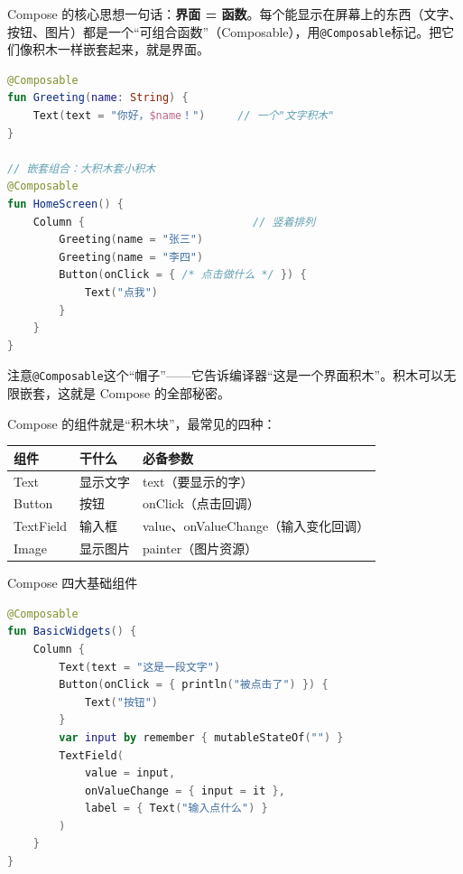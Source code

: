 


Compose 的核心思想一句话：\textbf{界面 = 函数}。每个能显示在屏幕上的东西（文字、按钮、图片）都是一个“可组合函数”（Composable），用\texttt{@Composable}标记。把它们像积木一样嵌套起来，就是界面。

\begin{lstlisting}[language=Kotlin]
@Composable
fun Greeting(name: String) {
    Text(text = "你好，$name！")     // 一个"文字积木"
}

// 嵌套组合：大积木套小积木
@Composable
fun HomeScreen() {
    Column {                          // 竖着排列
        Greeting(name = "张三")
        Greeting(name = "李四")
        Button(onClick = { /* 点击做什么 */ }) {
            Text("点我")
        }
    }
}
\end{lstlisting}

注意\texttt{@Composable}这个“帽子”——它告诉编译器“这是一个界面积木”。积木可以无限嵌套，这就是 Compose 的全部秘密。


Compose 的组件就是“积木块”，最常见的四种：

\begin{center}
\begin{tabularx}{\linewidth}{|X|X|X|}
\hline
\textbf{组件} & \textbf{干什么} & \textbf{必备参数} \tabularnewline
\hline
Text & 显示文字 & text（要显示的字） \tabularnewline
Button & 按钮 & onClick（点击回调） \tabularnewline
TextField & 输入框 & value、onValueChange（输入变化回调） \tabularnewline
Image & 显示图片 & painter（图片资源） \tabularnewline
\hline
\end{tabularx}
\end{center}

\begin{center}\small\color{gray}Compose 四大基础组件\end{center}

\begin{lstlisting}[language=Kotlin]
@Composable
fun BasicWidgets() {
    Column {
        Text(text = "这是一段文字")
        Button(onClick = { println("被点击了") }) {
            Text("按钮")
        }
        var input by remember { mutableStateOf("") }
        TextField(
            value = input,
            onValueChange = { input = it },
            label = { Text("输入点什么") }
        )
    }
}
\end{lstlisting}


